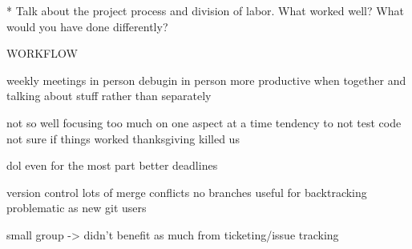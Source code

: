 * Talk about the project process and division of
labor. What worked well? What would you have done
differently?

WORKFLOW


weekly meetings  in person
debugin in person
more productive when together and talking about stuff rather than separately

not so well
focusing too much on one aspect at a time
tendency to not test code
    not sure if things worked
thanksgiving killed us

dol
even for the most part
better deadlines

version control
lots of merge conflicts
no branches
useful for backtracking
problematic as new git users

small group -> didn’t benefit as much from ticketing/issue tracking
